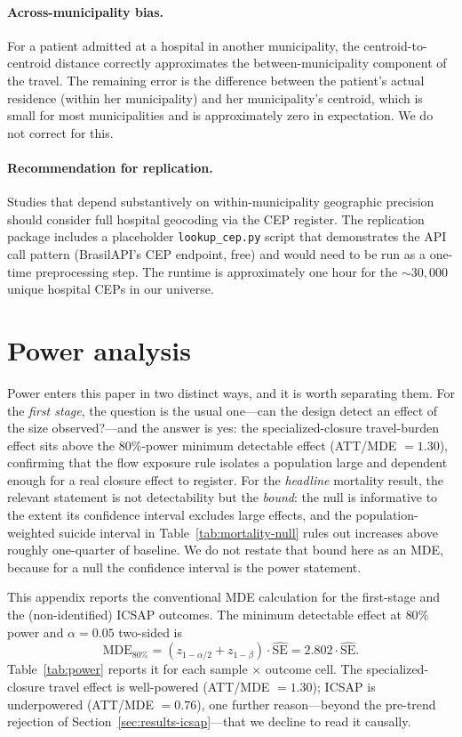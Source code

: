 \paragraph{Across-municipality bias.} For a patient admitted at a
hospital in another municipality, the centroid-to-centroid distance
correctly approximates the between-municipality component of the
travel. The remaining error is the difference between the patient's
actual residence (within her municipality) and her municipality's
centroid, which is small for most municipalities and is
approximately zero in expectation. We do not correct for this.

\paragraph{Recommendation for replication.} Studies that depend
substantively on within-municipality geographic precision should
consider full hospital geocoding via the CEP register. The replication
package includes a placeholder \texttt{lookup\_cep.py} script that
demonstrates the API call pattern (BrasilAPI's CEP endpoint, free)
and would need to be run as a one-time preprocessing step. The runtime
is approximately one hour for the $\sim 30{,}000$ unique hospital
CEPs in our universe.

\section{Power analysis}
\label{app:power}

Power enters this paper in two distinct ways, and it is worth separating
them. For the \emph{first stage}, the question is the usual one---can the
design detect an effect of the size observed?---and the answer is yes:
the specialized-closure travel-burden effect sits above the $80\%$-power
minimum detectable effect (ATT/MDE $= 1.30$), confirming that the flow
exposure rule isolates a population large and dependent enough for a real
closure effect to register. For the \emph{headline} mortality result, the
relevant statement is not detectability but the \emph{bound}: the null is
informative to the extent its confidence interval excludes large effects,
and the population-weighted suicide interval in
Table~\ref{tab:mortality-null} rules out increases above roughly
one-quarter of baseline. We do not restate that bound here as an MDE,
because for a null the confidence interval is the power statement.

This appendix reports the conventional MDE calculation for the
first-stage and the (non-identified) ICSAP outcomes. The minimum
detectable effect at $80\%$ power and $\alpha = 0.05$ two-sided is
\[
  \mathrm{MDE}_{80\%} = (z_{1-\alpha/2} + z_{1-\beta}) \cdot
  \widehat{\mathrm{SE}} = 2.802 \cdot \widehat{\mathrm{SE}}.
\]
Table~\ref{tab:power} reports it for each sample $\times$ outcome cell.
The specialized-closure travel effect is well-powered (ATT/MDE $= 1.30$);
ICSAP is underpowered (ATT/MDE $= 0.76$), one further reason---beyond the
pre-trend rejection of Section~\ref{sec:results-icsap}---that we decline
to read it causally.

